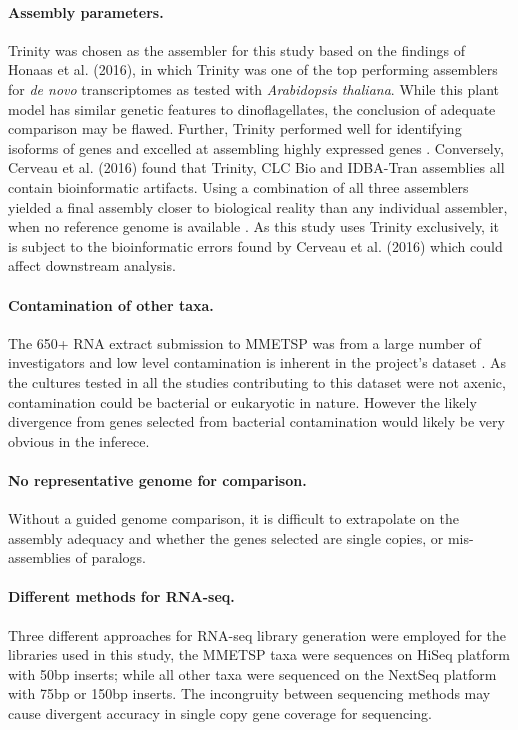 \documentclass[12pt]{article}
\begin{document}
\paragraph*{Assembly parameters.}
Trinity was chosen as the assembler for this study based on the findings of Honaas et al. (2016), in which Trinity was one of the top performing assemblers for \textit{de novo} transcriptomes as tested with \textit{Arabidopsis thaliana}. 
While this plant model has similar genetic features to dinoflagellates, the conclusion of adequate comparison may be flawed.
Further, Trinity performed well for identifying isoforms of genes and excelled at assembling highly expressed genes \cite{honaas2016selecting}.
Conversely, Cerveau et al. (2016) found that Trinity, CLC Bio and IDBA-Tran assemblies all contain bioinformatic artifacts. 
Using a combination of all three assemblers yielded a final assembly closer to biological reality than any individual assembler, when no reference genome is available \cite{cerveau2016combining}.
As this study uses Trinity exclusively, it is subject to the bioinformatic errors found by Cerveau et al. (2016) which could affect downstream analysis.
\paragraph*{Contamination of other taxa.} 
The 650+ RNA extract submission to MMETSP was from a large number of investigators and low level contamination is inherent in the project's dataset \cite{keeling2014marine}. 
As the cultures tested in all the studies contributing to this dataset were not axenic, contamination could be bacterial or eukaryotic in nature. 
However the likely divergence from genes selected from bacterial contamination would likely be very obvious in the inferece.
\paragraph*{No representative genome for comparison.} 
Without a guided genome comparison, it is difficult to extrapolate on the assembly adequacy and whether the genes selected are single copies, or mis-assemblies of paralogs.
\paragraph*{Different methods for RNA-seq.} 
Three different approaches for RNA-seq library generation were employed for the libraries used in this study, the MMETSP taxa were sequences on HiSeq platform with 50bp inserts; while all other taxa were sequenced on the NextSeq platform with 75bp or 150bp inserts. 
The incongruity between sequencing methods may cause divergent accuracy in single copy gene coverage for sequencing.  
\end{document}
